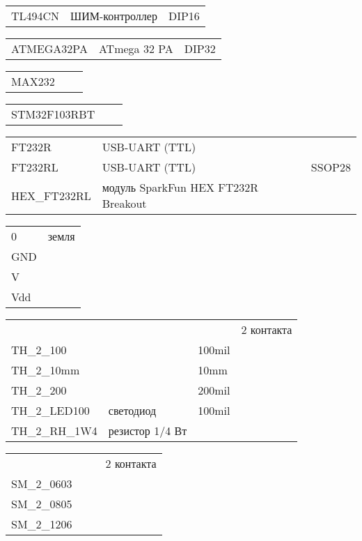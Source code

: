 
\begin{tabular}{l l l}
TL494CN & ШИМ-контроллер & DIP16 \\
\end{tabular}


\begin{tabular}{l l l}
ATMEGA32PA & ATmega 32 PA & DIP32 \\
\end{tabular}


\begin{tabular}{l l l}
MAX232 \\
\end{tabular}


\begin{tabular}{l l l}
STM32F103RBT \\
\end{tabular}


\begin{tabular}{l l l}
FT232R & USB-UART (TTL) \\
FT232RL & USB-UART (TTL) & SSOP28 \\
HEX\_FT232RL & модуль SparkFun HEX FT232R Breakout \\
\end{tabular}

\secup


\begin{tabular}{l l}
0 & земля \\
GND \\
V \\
Vdd \\
\end{tabular}

\secdown


\begin{tabular}{l l l l}
&&& 2 контакта \\
TH\_2\_100 & & 100mil \\
TH\_2\_10mm & & 10mm \\
TH\_2\_200 & & 200mil \\
TH\_2\_LED100 & светодиод & 100mil \\
TH\_2\_RH\_1W4 & резистор 1/4 Вт & \\
\end{tabular}


\begin{tabular}{l l l l}
&&& 2 контакта \\
SM\_2\_0603 \\
SM\_2\_0805 \\
SM\_2\_1206 \\
\end{tabular}

\secup

\secup
